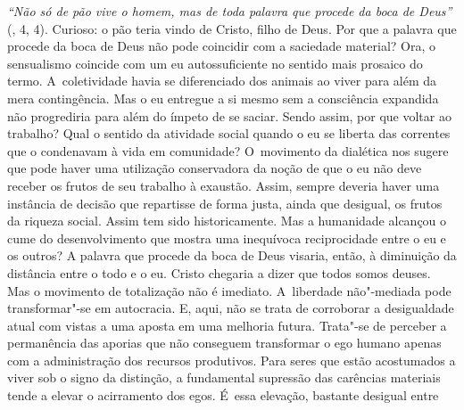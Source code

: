 \emph{``Não só de pão vive o homem, mas de toda palavra que procede da
boca de Deus''} (, 4, 4). Curioso: o pão teria vindo de Cristo,
filho de Deus. Por que a palavra que procede da boca de Deus não pode
coincidir com a saciedade material? Ora, o sensualismo coincide com um
eu autossuficiente no sentido mais prosaico do termo. A~coletividade
havia se diferenciado dos animais ao viver para além da mera
contingência. Mas o eu entregue a si mesmo sem a consciência expandida
não progrediria para além do ímpeto de se saciar. Sendo assim, por que
voltar ao trabalho? Qual o sentido da atividade social quando o eu se
liberta das correntes que o condenavam à vida em comunidade? O~movimento
da dialética nos sugere que pode haver uma utilização conservadora da
noção de que o eu não deve receber os frutos de seu trabalho à exaustão.
Assim, sempre deveria haver uma instância de decisão que repartisse de
forma justa, ainda que desigual, os frutos da riqueza social. Assim tem
sido historicamente. Mas a humanidade alcançou o cume do desenvolvimento
que mostra uma inequívoca reciprocidade entre o eu e os outros? A
palavra que procede da boca de Deus visaria, então, à diminuição da
distância entre o todo e o eu. Cristo chegaria a dizer que todos somos
deuses. Mas o movimento de totalização não é imediato. A~liberdade
não"-mediada pode transformar"-se em autocracia. E, aqui, não se trata de
corroborar a desigualdade atual com vistas a uma aposta em uma melhoria
futura. Trata"-se de perceber a permanência das aporias que não conseguem
transformar o ego humano apenas com a administração dos recursos
produtivos. Para seres que estão acostumados a viver sob o signo da
distinção, a fundamental supressão das carências materiais tende a
elevar o acirramento dos egos. É~essa elevação, bastante desigual entre
